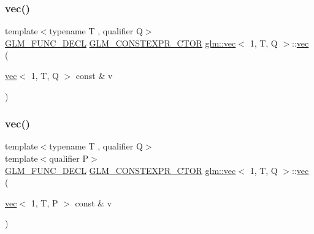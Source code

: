 \mbox{\label{structglm_1_1vec_3_011_00_01_t_00_01_q_01_4_ac61412a4328fca49ded68a788eee5385}} 
\subsubsection{\texorpdfstring{vec()}{vec()}\hspace{0.1cm}{\footnotesize\ttfamily [2/14]}}
{\footnotesize\ttfamily template$<$typename T , qualifier Q$>$ \\
\hyperlink{setup_8hpp_ab2d052de21a70539923e9bcbf6e83a51}{G\+L\+M\+\_\+\+F\+U\+N\+C\+\_\+\+D\+E\+CL} \hyperlink{setup_8hpp_ad34178a09666081abdb573c14d1f4a5a}{G\+L\+M\+\_\+\+C\+O\+N\+S\+T\+E\+X\+P\+R\+\_\+\+C\+T\+OR} \hyperlink{structglm_1_1vec}{glm\+::vec}$<$ 1, T, Q $>$\+::\hyperlink{structglm_1_1vec}{vec} (\begin{DoxyParamCaption}\item[{\hyperlink{structglm_1_1vec}{vec}$<$ 1, T, Q $>$ const \&}]{v }\end{DoxyParamCaption})}

\mbox{\label{structglm_1_1vec_3_011_00_01_t_00_01_q_01_4_a335f0b237f2efd588837a62b9a8e7306}} 
\subsubsection{\texorpdfstring{vec()}{vec()}\hspace{0.1cm}{\footnotesize\ttfamily [3/14]}}
{\footnotesize\ttfamily template$<$typename T , qualifier Q$>$ \\
template$<$qualifier P$>$ \\
\hyperlink{setup_8hpp_ab2d052de21a70539923e9bcbf6e83a51}{G\+L\+M\+\_\+\+F\+U\+N\+C\+\_\+\+D\+E\+CL} \hyperlink{setup_8hpp_ad34178a09666081abdb573c14d1f4a5a}{G\+L\+M\+\_\+\+C\+O\+N\+S\+T\+E\+X\+P\+R\+\_\+\+C\+T\+OR} \hyperlink{structglm_1_1vec}{glm\+::vec}$<$ 1, T, Q $>$\+::\hyperlink{structglm_1_1vec}{vec} (\begin{DoxyParamCaption}\item[{\hyperlink{structglm_1_1vec}{vec}$<$ 1, T, P $>$ const \&}]{v }\end{DoxyParamCaption})}

